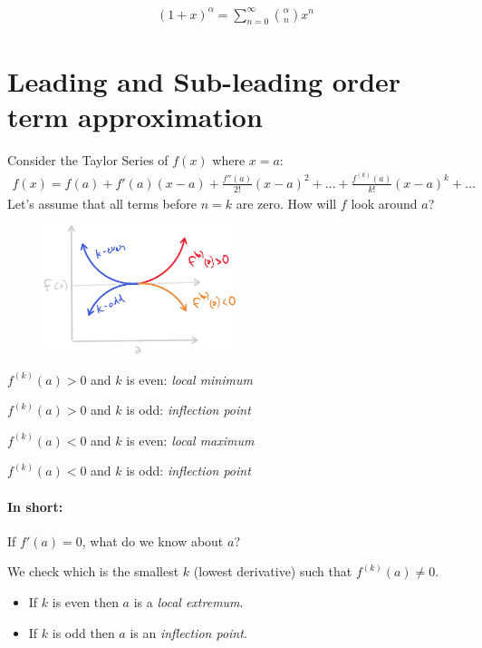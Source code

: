 \documentclass[00_complete]{subfiles}
\begin{document}
$$
\begin{gathered}
    (1+x)^\alpha = \sum_{n=0}^{\infty} \binom{\alpha}{n}x^n
\end{gathered}
$$

\section{Leading and Sub-leading order term approximation}

Consider the Taylor Series of $f(x)$ where $x=a$:
$$
\begin{gathered}
    f(x)=f(a)+f'(a)(x-a)+\frac{f''(a)}{2!}(x-a)^2 + \dots +
    \frac{f^{(k)}(a)}{k!}(x-a)^k + \dots
\end{gathered}
$$
Let's assume that all terms before $n=k$ are zero. How will $f$ look around
$a$?

\begin{figure}[ht]
  \centering
    \includegraphics[width=0.5\textwidth]{w6-order}
\end{figure}

$f^{(k)}(a) > 0$ and $k$ is even: \emph{local minimum}

$f^{(k)}(a) > 0$ and $k$ is odd: \emph{inflection point}

$f^{(k)}(a) < 0$ and $k$ is even: \emph{local maximum}

$f^{(k)}(a) < 0$ and $k$ is odd: \emph{inflection point}

\paragraph{In short:}

If $f'(a) = 0$, what do we know about $a$?

We check which is the smallest $k$ (lowest derivative) such that $f^{(k)}(a)
\neq 0$.

\begin{itemize}
\item If $k$ is even then $a$ is a \emph{local extremum}.
\item If $k$ is odd then $a$ is an \emph{inflection point}.
\end{itemize}
\end{document}
